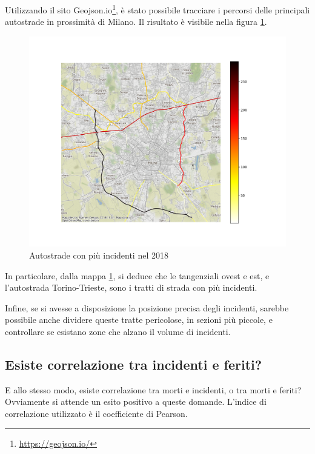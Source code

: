 \documentclass[a4paper]{report}
\begin{document}
Utilizzando il sito Geojson.io\footnote{\url{https://geojson.io/}}, 
è stato possibile tracciare i percorsi delle principali autostrade in prossimità di 
Milano. Il risultato è visibile nella figura \ref{fig:line-incidenti-milano}.

\begin{figure}
    \includegraphics[width=\linewidth]{../src/incidenti/incidenti_aci/autostrade/incidenti_line_chart.png}
    \caption{Autostrade con più incidenti nel 2018}
    \label{fig:line-incidenti-milano}
\end{figure}

In particolare, dalla mappa \ref{fig:line-incidenti-milano}, si deduce che le 
tangenziali ovest e est, e l'autostrada Torino-Trieste, sono i tratti di 
strada con più incidenti.

Infine, se si avesse a disposizione la posizione precisa degli incidenti, 
sarebbe possibile anche dividere queste tratte pericolose, in sezioni più piccole, 
e controllare se esistano zone che alzano il volume di incidenti.

\subsection{Esiste correlazione tra incidenti e feriti?}

E allo stesso modo, esiste correlazione tra morti e incidenti, o tra morti e feriti?\\
Ovviamente si attende un esito positivo a queste domande.
L'indice di correlazione utilizzato è il coefficiente di Pearson.
\end{document}

